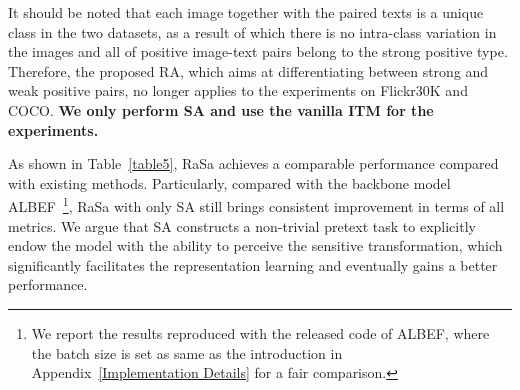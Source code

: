 \documentclass{article}
\begin{document}
It should be noted that each image together with the paired texts is a unique class in the two datasets, as a result of which there is no intra-class variation in the images and all of positive image-text pairs belong to the strong positive type.
Therefore, the proposed RA, which aims at differentiating between strong and weak positive pairs, no longer applies to the experiments on Flickr30K and COCO.
\textbf{We only perform SA and use the vanilla ITM for the experiments.}





As shown in Table~\ref{table5}, RaSa achieves a comparable performance compared with existing methods. 
Particularly, compared with the backbone model ALBEF~\cite{NEURIPS2021_50525975}\footnote{We report the results reproduced with the released code of ALBEF, where the batch size is set as same as the introduction in Appendix~\ref{Implementation Details} for a fair comparison.}, RaSa with only SA still brings consistent improvement in terms of all metrics.
We argue that SA constructs a non-trivial pretext task to explicitly endow the model with the ability to perceive the sensitive transformation, which significantly facilitates the representation learning and eventually gains a better performance.
\end{document}
